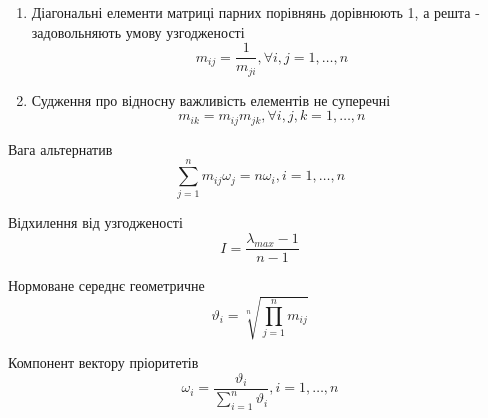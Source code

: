 \begin{enumerate}
    \item Діагональні елементи матриці парних порівнянь дорівнюють 1,
          а решта - задовольняють умову узгодженості
          \begin{equation}
              \label{eq:consistency}
              m_{ij} = \frac{1}{m_{ji}},
              \forall i, j = 1, \ldots, n
          \end{equation}
    \item Судження про відносну важливість елементів не суперечні
          \begin{equation}
              \label{eq:not_conflicting}
              m_{ik} = m_{ij}m_{jk},
              \forall i, j, k = 1, \ldots, n
          \end{equation}
\end{enumerate}

Вага альтернатив
\begin{equation}
    \label{eq:weight}
    \sum_{j=1}^n m_{ij}\omega_j = n\omega_i, i = 1, \ldots, n
\end{equation}

Відхилення від узгодженості
\begin{equation}
    \label{eq:deviation}
    I = \frac{\lambda_{max} - 1}{n - 1}
\end{equation}

Нормоване середнє геометричне
\begin{equation}
    \label{eq:normalized_geometric_mean}
    \vartheta_i = \sqrt[n]{\prod_{j=1}^n m_{ij}}
\end{equation}

Компонент вектору пріоритетів
\begin{equation}
    \label{eq:eigen_vector}
    \omega_i = \frac{\vartheta_i}{\sum_{i=1}^n \vartheta_i}, i = 1, \ldots, n
\end{equation}
